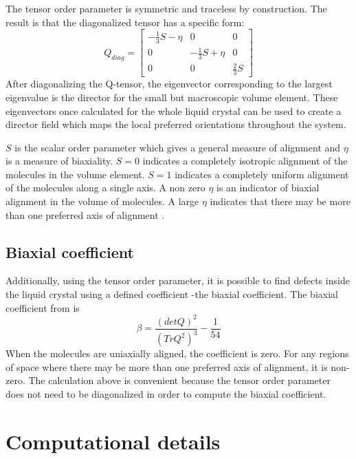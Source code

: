 \documentclass[preprint, aps]{revtex4-1}
\begin{document}
The tensor order parameter is symmetric and traceless by construction. The 
result is that the diagonalized tensor has a specific form:
	\begin{equation*} \label{diag-q-tensor}
		Q_{diag} = 
		\begin{bmatrix}
			-\frac{1}{3} S - \eta 
			& 0 
			& 0 \\
			0 
			& -\frac{1}{3} S + \eta 
			& 0 \\
			0 
			& 0 
			& \frac{2}{3} S
		\end{bmatrix}
	\end{equation*}
After diagonalizing the Q-tensor, the eigenvector corresponding to the largest
eigenvalue is the director for the small but macroscopic volume element. These
eigenvectors once calculated for the whole liquid crystal can be used to create
a director field which maps the local preferred orientations throughout the
system. 

$S$ is the scalar order parameter which gives a general measure of alignment 
and $\eta$ is a measure of biaxiality. $S=0$ indicates a completely isotropic 
alignment of the molecules in the volume element. $S=1$ indicates a completely 
uniform alignment of the molecules along a single axis. A non zero $\eta$ is an 
indicator of biaxial alignment in the volume of molecules. A large $\eta$ 
indicates that there may be more than one preferred axis of alignment
\cite{degennes95}.

\subsection*{Biaxial coefficient}
Additionally, using the tensor order parameter, it is possible to find defects 
inside the liquid crystal using a defined coefficient -the biaxial coefficient. 
The biaxial coefficient from \cite{tovkach17} is
	\begin{equation} \label{biaxial}
		\beta = \frac{(detQ)^2}{(TrQ^2)^3} - \frac{1}{54}
	\end{equation}
When the molecules are uniaxially aligned, the coefficient is zero. For any
regions of space where there may be more than one preferred axis of alignment,
it is non-zero. The calculation above is convenient because the tensor order
parameter does not need to be diagonalized in order to compute the biaxial
coefficient.

\section*{Computational details}
\end{document}
